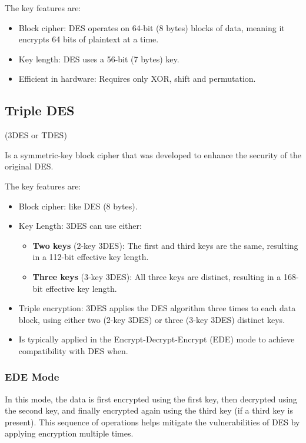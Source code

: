 The key features are:
\begin{itemize}
    \item Block cipher: DES operates on 64-bit (8 bytes) blocks of data, meaning it encrypts 64 bits of plaintext at a time.
    \item Key length: DES uses a 56-bit (7 bytes) key.
    \item Efficient in hardware: Requires only XOR, shift and permutation.
\end{itemize}

\subsection{Triple DES}
\begin{center}
    (3DES or TDES)
\end{center}

Is a symmetric-key block cipher that was developed to enhance the security of the original DES.

The key features are:
\begin{itemize}
    \item Block cipher: like DES (8 bytes).
    \item Key Length: 3DES can use either:
    \begin{itemize}
        \item \textbf{Two keys} (2-key 3DES): The first and third keys are the same, resulting in a 112-bit effective key length.
        \item \textbf{Three keys} (3-key 3DES): All three keys are distinct, resulting in a 168-bit effective key length.
    \end{itemize}
    \item Triple encryption: 3DES applies the DES algorithm three times to each data block, using either two (2-key 3DES) or three (3-key 3DES) distinct keys.
    \item Is typically applied in the Encrypt-Decrypt-Encrypt (EDE) mode to achieve compatibility with DES when.
\end{itemize}

\subsubsection*{EDE Mode}
In this mode, the data is first encrypted using the first key, then decrypted using the second key, and finally encrypted again using the third key (if a third key is present). This sequence of operations helps mitigate the vulnerabilities of DES by applying encryption multiple times.

